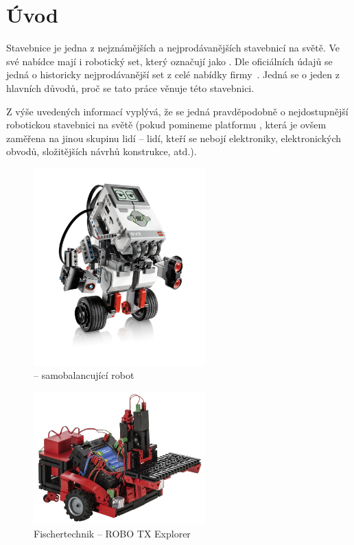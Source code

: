 \chapter{Úvod}

Stavebnice \lego{ }je jedna z nejznámějších a nejprodávanějších stavebnicí na světě. 
Ve své nabídce mají i robotický set, který označují jako \legoM. 
Dle oficiálních údajů se jedná o historicky nejprodávanější set z celé nabídky firmy~\cite{legoGizmodo_SalesStatistic}. 
Jedná se o jeden z hlavních důvodů, proč se tato práce věnuje této stavebnici. 

Z výše uvedených informací vyplývá, že se jedná pravděpodobně o nejdostupnější robotickou stavebnici na světě (pokud pomineme platformu \arduino, která je ovšem zaměřena na jinou skupinu lidí -- lidí, kteří se nebojí elektroniky, elektronických obvodů, složitějších návrhů konstrukce, atd.).

\begin{figure}[h]
 	\centering
	\includegraphics[width=250px]{images/lego-mindstorms-ev3_Robotics-for-Kids.png}
		\caption[\legoEV{ }-- samobalancující robot]{\legoEV{ }-- samobalancující robot\protect\footnotemark}
	\label{fig:lego-mindstorms-ev3_Robotics-for-Kids}
\end{figure}



\begin{figure}[h]
 	\centering
	\includegraphics[width=250px]{images/fischertechnik_ROBO-TX-Explorer_02.jpg}
		\caption[Fischertechnik -- ROBO TX Explorer]{Fischertechnik -- ROBO TX Explorer\protect\footnotemark}
	\label{fig:fischertechnik_ROBO-TX-Explorer}
\end{figure}

